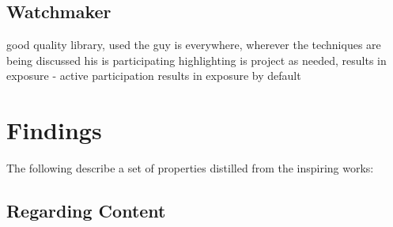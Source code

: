 \documentclass[a4paper, 11pt]{article}
\begin{document}
% 
% 
\subsection{Watchmaker}

good quality library, used
the guy is everywhere, wherever the techniques are being discussed his is participating
highlighting is project as needed, results in exposure - active participation results in exposure by default


% 
% 
\section{Findings}
\label{sec:findings}

The following describe a set of properties distilled from the inspiring works:

\subsection{Regarding Content}
\end{document}
